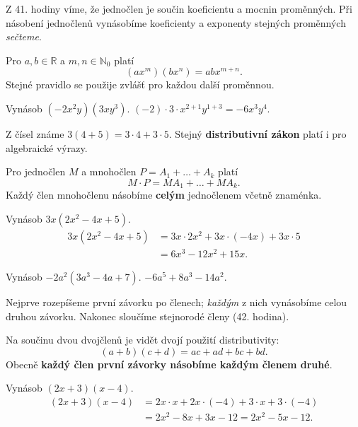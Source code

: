 \documentclass[11pt,a4paper]{article}
\begin{document}
Z 41. hodiny víme, že jednočlen je součin koeficientu a mocnin proměnných. Při násobení jednočlenů vynásobíme koeficienty a exponenty stejných proměnných \emph{sečteme}.
\begin{definiceBox}[title={Věta - Součin jednočlenů}]
Pro $a,b\in\mathbb R$ a $m,n\in\mathbb N_0$ platí
\[(ax^m)(bx^n)=abx^{m+n}.\]
Stejné pravidlo se použije zvlášť pro každou další proměnnou.
\end{definiceBox}
\begin{prikladReseniBox}[title={Příklad 1}]
Vynásob $(-2x^2y)(3xy^3)$.
\tcblower
$(-2)\cdot3\cdot x^{2+1}y^{1+3}=-6x^3y^4$.
\end{prikladReseniBox}
Z čísel známe $3(4+5)=3\cdot4+3\cdot5$. Stejný \textbf{distributivní zákon} platí i pro algebraické výrazy.
\begin{definiceBox}[title={Věta - Násobení jednočlenu mnohočlenem}]
Pro jednočlen $M$ a mnohočlen $P=A_1+\dots+A_k$ platí
\[M\cdot P=M A_1+\dots+M A_k.\]
Každý člen mnohočlenu násobíme \textbf{celým} jednočlenem včetně znaménka.
\end{definiceBox}
\begin{prikladReseniBox}[title={Příklad 2}]
Vynásob $3x(2x^2-4x+5)$.
\tcblower
\begin{align*}
3x(2x^2-4x+5)&=3x\cdot2x^2+3x\cdot(-4x)+3x\cdot5\\
&=6x^3-12x^2+15x.
\end{align*}
\end{prikladReseniBox}
\begin{prikladReseniBox}[title={Příklad 3}]
Vynásob $-2a^2(3a^3-4a+7)$.
\tcblower
$-6a^5+8a^3-14a^2$.
\end{prikladReseniBox}
Nejprve rozepíšeme první závorku po členech; \emph{každým} z nich vynásobíme celou druhou závorku. Nakonec sloučíme stejnorodé členy (42. hodina).
\begin{definiceBox}[title={Věta - Součin dvou dvojčlenů}]
Na součinu dvou dvojčlenů je vidět dvojí použití distributivity:
\[(a+b)(c+d)=ac+ad+bc+bd.\]
Obecně \textbf{každý člen první závorky násobíme každým členem druhé}.
\end{definiceBox}
\begin{prikladReseniBox}[title={Příklad 4}]
Vynásob $(2x+3)(x-4)$.
\tcblower
\begin{align*}
(2x+3)(x-4)&=2x\cdot x+2x\cdot(-4)+3\cdot x+3\cdot(-4)\\
&=2x^2-8x+3x-12=2x^2-5x-12.
\end{align*}
\end{prikladReseniBox}
\end{document}
